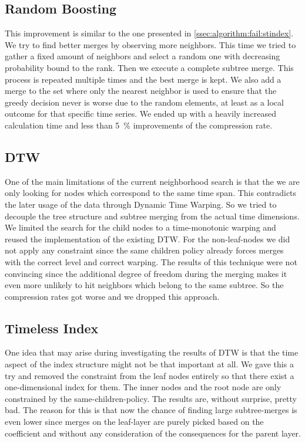\subsection{Random Boosting}
\label{ssec:algorithm:fail:random}

This improvement is similar to the one presented in \autoref{ssec:algorithm:fail:stindex}. We try to find better merges by observing more neighbors. This time we tried to gather a fixed amount of neighbors and select a random one with decreasing probability bound to the rank. Then we execute a complete subtree merge. This process is repeated multiple times and the best merge is kept. We also add a merge to the set where only the nearest neighbor is used to ensure that the greedy decision never is worse due to the random elements, at least as a local outcome for that specific time series. We ended up with a heavily increased calculation time and less than \SI{5}{\percent} improvements of the compression rate.


\subsection{DTW}
\label{ssec:algorithm:fail:dtw}

One of the main limitations of the current neighborhood search is that the we are only looking for nodes which correspond to the same time span. This contradicts the later usage of the data through Dynamic Time Warping. So we tried to decouple the tree structure and subtree merging from the actual time dimensions. We limited the search for the child nodes to a time-monotonic warping and reused the implementation of the existing DTW\@. For the non-leaf-nodes we did not apply any constraint since the same children policy already forces merges with the correct level and correct warping. The results of this technique were not convincing since the additional degree of freedom during the merging makes it even more unlikely to hit neighbors which belong to the same subtree. So the compression rates got worse and we dropped this approach.


\subsection{Timeless Index}
\label{ssec:algorithm:fail:timeless}

One idea that may arise during investigating the results of DTW is that the time aspect of the index structure might not be that important at all. We gave this a try and removed the constraint from the leaf nodes entirely so that there exist a one-dimensional index for them. The inner nodes and the root node are only constrained by the same-children-policy. The results are, without surprise, pretty bad. The reason for this is that now the chance of finding large subtree-merges is even lower since merges on the leaf-layer are purely picked based on the coefficient and without any consideration of the consequences for the parent layer.


